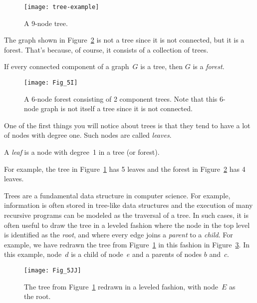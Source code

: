 \begin{figure}\redrawn

\texttt{[image: tree-example]}

\caption{A 9-node tree.}
\label{fig:5H}
\end{figure}

The graph shown in Figure~\ref{fig:5I} is not a tree since it is not
connected, but it is a forest.  That's because, of course, it consists
of a collection of trees.

\begin{definition}\label{def:forest}
If every connected component of a graph~$G$ is a tree, then $G$ is a
\emph{forest}.
\end{definition}

\begin{figure}\redrawn

\texttt{[image: Fig\_5I]}

\caption{A 6-node forest consisting of 2 component trees.  Note that
  this 6-node graph is not itself a tree since it is not connected.}
\label{fig:5I}
\end{figure}

One of the first things you will notice about trees is that they tend
to have a lot of nodes with degree one.  Such nodes are called
\emph{leaves}.

\begin{definition}
A \emph{leaf} is a node with degree~1 in a tree (or forest).
\end{definition}

For example, the tree in Figure~\ref{fig:5H} has 5 leaves and the
forest in Figure~\ref{fig:5I} has 4 leaves.

Trees are a fundamental data structure in computer science.  For
example, information is often stored in tree-like data structures and
the execution of many recursive programs can be modeled as the
traversal of a tree.  In such cases, it is often useful to draw the
tree in a leveled fashion where the node in the top level is
identified as the \emph{root}, and where every edge joins a
\emph{parent} to a \emph{child}.  For example, we have redrawn the
tree from Figure~\ref{fig:5H} in this fashion in Figure~\ref{fig:5JJ}.
In this example, node~$d$ is a child of node~$e$ and a parents of
nodes $b$ and~$c$.

\begin{figure}\redrawn

\texttt{[image: Fig\_5JJ]}

\caption{The tree from Figure~\ref{fig:5H} redrawn in a leveled
  fashion, with node~$E$ as the root.}

\label{fig:5JJ}
\end{figure}

